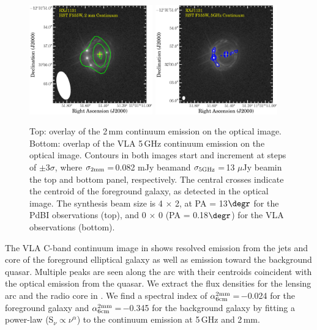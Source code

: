 \documentclass[]{emulateapj}
\begin{document}
\begin{figure}[!htbp]
\includegraphics[trim=12 27 0 1, clip, width=0.475\textwidth]{../Figures/F555W_ContPdBI.eps}
\includegraphics[trim=10 5 0 0, clip, width=0.4695\textwidth]{../Figures/F555W_ContVLA.eps}
\caption{Top: overlay of the 2\,mm continuum emission on the optical image.
Bottom: overlap of the VLA 5\,GHz continuum emission on the optical image.
Contours in both images start and increment at steps of
$\pm$3$\sigma$, where $\sigma_{\rm 2mm}$\,=\,0.082 mJy beam\pmOne and
$\sigma_{\rm 5GHz}$\,=\,13 $\mu$Jy beam\pmOne in the top and bottom panel, respectively.
The central crosses indicate the centroid of the foreground galaxy,
as detected in the optical image. 
The synthesis beam size is 4 $\times$ 2, at PA = 13$\degr$ for
the PdBI observations (top), and 
0 $\times$ 0 (PA = 0.18$\degr$) for
the VLA observations (bottom).
\label{fig:cont}}\vspace{0.51em}
\end{figure}

The VLA C-band continuum image in  shows resolved emission from the
jets and core of the foreground elliptical galaxy
as well as emission toward the background quasar.
Multiple peaks are seen along the arc with their centroids
coincident with the optical emission from the quasar.
We extract the flux densities for the lensing arc and the radio core in .
We find a spectral index of $\alpha^{\rm 2mm}_{\rm 6cm}$\,=\,$-$0.024
for the foreground
galaxy and $\alpha^{\rm 2mm}_{\rm 6cm}$\,=\,$-$0.345
for the background galaxy by fitting a
power-law (S$_\nu \propto \nu^{\alpha}$) to the continuum emission at
5\,GHz and 2\,mm.
\end{document}
